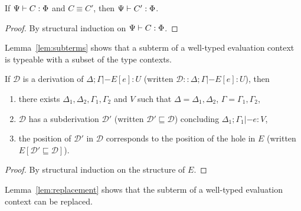 \begin{lemma}\label{lem:equiv}
  If $\Psi |- C : \Phi$ and $C \equiv C'$, then $\Psi |- C' : \Phi$.
  \begin{proof}
    By structural induction on $\Psi |- C : \Phi$.
  \end{proof}
\end{lemma}

Lemma~\ref{lem:subterms} shows that a subterm of a well-typed evaluation context
is typeable with a subset of the type contexts. 

\begin{lemma}\label{lem:subterms}
  If $\mathcal{D}$ is a derivation of $\Delta; \Gamma |- E[e] : U$ (written $\mathcal{D}
  :: \Delta;\Gamma |- E[e] : U$), then
  \begin{enumerate}
    \item there exists $\Delta_1, \Delta_2, \Gamma_1,\Gamma_2$ and $V$ such that $\Delta = \Delta_1,\Delta_2$, $\Gamma =
      \Gamma_1,\Gamma_2$,
    \item $\mathcal{D}$ has a subderivation $\mathcal{D}'$ (written
      $\mathcal{D}' \sqsubseteq \mathcal{D}$) concluding $\Delta_1;\Gamma_1 |- e : V$,
    \item the position of $\mathcal{D}'$ in $\mathcal{D}$ corresponds to the
      position of the hole in $E$ (written $E[\mathcal{D}' \sqsubseteq \mathcal{D}]$).
  \end{enumerate}
  \begin{proof}
    By structural induction on the structure of $E$.
  \end{proof}
\end{lemma}


Lemma~\ref{lem:replacement} shows that the subterm of a well-typed evaluation
context can be replaced.

